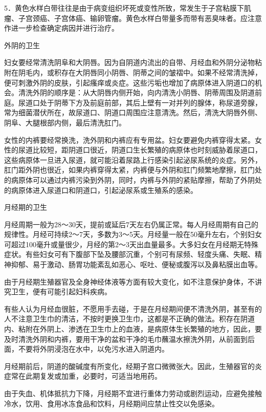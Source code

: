 \documentclass[12pt,UTF8,openany]{ctexbook}
\begin{document}
5．黄色水样白带往往是由于病变组织坏死或变性所致，常发生于子宫粘膜下肌瘤、子宫颈癌、子宫体癌、输卵管瘤。黄色水样白带量多而带有恶臭味者。应注意作进一步检查确定病因并进行治疗。

外阴的卫生

妇女要经常清洗阴阜和大阴唇。因为自阴道内流出的自带、月经血和外阴分泌物粘附在阴毛内，或积存在大阴唇同小阴唇、阴蒂之间的皱褶中。如果不经常清洗掉，便可刺激外阴的皮肤，引起瘙痒或炎症。这些污垢也增加了病原体进入阴道口的机会。清洗外阴的顺序是：从大阴唇内侧开始，向内清洗小阴唇、阴蒂周围及阴道前庭。尿道口处于阴蒂下方及前庭前部，其后上壁有一对并列的腺体，称尿道旁腺，常为细菌潜伏所在，故尿道口、阴道口周围应注意清洗。然后，清洗大阴唇外侧、阴阜、大腿根部内侧，最后清洗肛门。

女性的内裤要经常换洗，洗外阴和内裤应有专用盆。妇女要避免内裤穿得太紧。女性的尿道比较短，距阴道口很近，阴道口生长繁殖的病原体也时刻威胁着尿道口，这些病原体一旦进入尿道，就可能沿着尿路上行感染引起泌尿系统的炎症。另外，肛门距外阴也很近，如果内裤穿得太紧，内裤便与外阴和肛门频繁地摩擦，肛门处的病原体可以通过内裤污染到外阴，同时，内裤与外阴的紧贴摩擦，帮助了外阴处的病原体进入尿道口和阴道口，引起泌尿系或生殖系的感染。

月经期的卫生

月经周期一般为28～30天，提前或延后7天左右仍属正常。每人月经周期有自己的规律性。月经可持续2～7天，多数为3～5天。月经量一般在50毫升左右，个别妇女可超过100毫升或量很少，月经的第2～3天出血量最多。大多妇女在月经期无特殊症状。有些妇女可有下腹部下坠及腰部沉重，个别可有尿频、轻度头痛、失眠、精神抑郁、易于激动、肠胃功能紊乱如恶心、呕吐、便秘或腹泻以及鼻粘膜出血等。

由于月经期生殖器官及全身神经体液等方面有较大变化，如不注意保护身体，不讲究卫生，便有可能引起妇科疾病。

有些人认为月经血很脏，不愿用手去碰，于是在月经期间便不清洗外阴，甚至有的人不注意卫生巾的清洁，不按时更换卫生巾，这都是不正确的做法。积存在阴道内、粘附在外阴上、渗透在卫生巾上的血液，是病原体生长繁殖的地方，因此，要及时清洗外阴和内裤，要用干净的盆和干净的毛巾蘸温水擦洗外阴，从前面到后面，不要将外阴浸泡在水中，以免污水进入阴道内。

月经期前后，阴道的酸碱度有所变化，经期子宫口微微张大。因此，生殖器官的炎症常在此期复发或加重，必要时，可适当地用药。

由于失血、机体抵抗力下降，月经期不宜进行重体力劳动或剧烈运动，应避免接触冷水，饮用、食用冰冻食品和饮料，月经期间应禁止性交以免感染。
\end{document}
